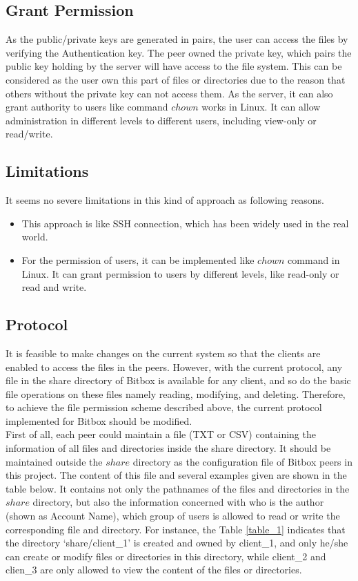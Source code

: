 \documentclass[a4paper,10pt,titlepage,twocolumn]{article}
\begin{document}
    \subsection{Grant Permission}
    As the public/private keys are generated in pairs, the user can access the files by verifying the Authentication key. The peer owned the private key, which pairs the public key holding by the server will have access to the file system. This can be considered as the user own this part of files or directories due to the reason that others without the private key can not access them. As the server, it can also grant authority to users like command $chown$ works in Linux. It can allow administration in different levels to different users, including view-only or read/write.
    \subsection{Limitations}
    It seems no severe limitations in this kind of approach as following reasons.
    \begin{itemize}
        \item This approach is like SSH connection, which has been widely used in the real world. 
        \item For the permission of users, it can be implemented like $chown$ command in Linux. It can grant permission to users by different levels, like read-only or read and write.
    \end{itemize}
    \subsection{Protocol}
    It is feasible to make changes on the current system so that the clients are enabled to access the files in the peers. However, with the current protocol, any file in the share directory of Bitbox is available for any client, and so do the basic file operations on these files namely reading, modifying, and deleting. Therefore, to achieve the file permission scheme described above, the current protocol implemented for Bitbox should be modified.
    \\First of all, each peer could maintain a file (TXT or CSV) containing the information of all files and directories inside the share directory. It should be maintained outside the $share$ directory as the configuration file of Bitbox peers in this project. The content of this file and several examples given are shown in the table below. It contains not only the pathnames of the files and directories in the $share$ directory, but also the information concerned with who is the author (shown as Account Name), which group of users is allowed to read or write the corresponding file and directory. For instance, the Table \ref{table_1} indicates that the directory ‘share/client\_1’ is created and owned by client\_1, and only he/she can create or modify files or directories in this directory, while client\_2 and clien\_3 are only allowed to view the content of the files or directories.
\end{document}
